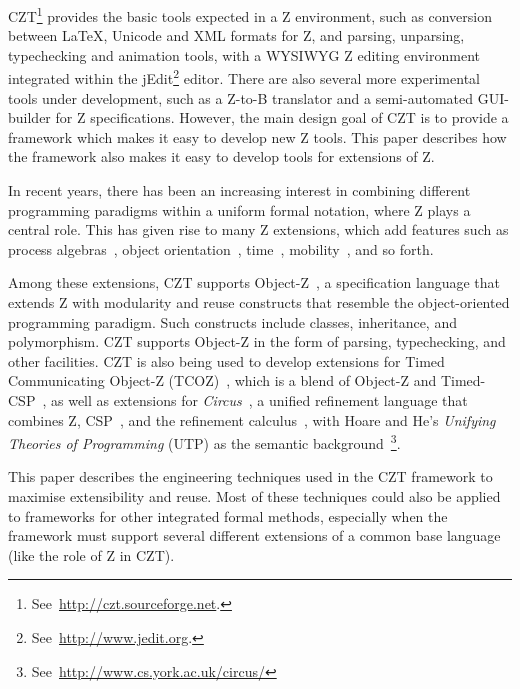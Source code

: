 \documentclass{llncs}
\newcommand{\Circus}{{\sf\slshape Circus}}
\begin{document}
  CZT\footnote{See~\url{http://czt.sourceforge.net}.} provides the basic tools
  expected in a Z environment, such as
  conversion between \LaTeX, Unicode and XML formats for Z, and
  parsing, unparsing, typechecking and animation tools, with a WYSIWYG
  Z editing environment integrated within the
  jEdit\footnote{See~\url{http://www.jedit.org}.} editor.
  There are also several more experimental tools under development,
  such as a Z-to-B translator and a semi-automated GUI-builder for
  Z specifications.  However, the main design goal of CZT is to
  provide a framework which makes it easy to develop new Z tools.
  This paper describes how the framework also makes it easy to develop
  tools for extensions of Z.

  In recent years, there has been an increasing interest in combining
  different programming paradigms within a uniform formal notation,
  where Z plays a central role. This has given rise to many Z
  extensions, which add features such as
  process algebras~\cite{fischer-1998,fischer-2000,circus.sem:intro},
  object orientation~\cite{oz,ohcircus},
  time~\cite{tcoz,circus.sem:real.time2},
  mobility~\cite{circus.sem:mobility}, and so forth.

  Among these extensions, CZT supports Object-Z~\cite{oz}, a
  specification language that extends Z with modularity and reuse
  constructs that resemble the object-oriented programming
  paradigm. Such constructs include classes, inheritance, and
  polymorphism. CZT supports Object-Z in the form of parsing,
  typechecking, and other facilities.  CZT is also being used to
  develop extensions for Timed Communicating Object-Z (TCOZ)~\cite{tcoz},
  which is a blend of Object-Z and Timed-CSP~\cite{timed-csp}, as well
  as extensions for \Circus~\cite{circus.sem:intro}, a unified
  refinement language that combines Z, CSP~\cite{csp.books:roscoe},
  and the refinement calculus~\cite{fm.ref:morgan}, with Hoare and
  He's \textit{Unifying Theories of Programming} (UTP) as the semantic
  background~\cite{hoare.utp}\footnote{See~\url{http://www.cs.york.ac.uk/circus/}}.

  This paper describes the engineering techniques used in the CZT framework
  to maximise extensibility and reuse.
  Most of these techniques could also be applied to frameworks
  for other integrated formal methods, especially when the
  framework must support several different extensions of a common
  base language (like the role of Z in CZT).
\end{document}
